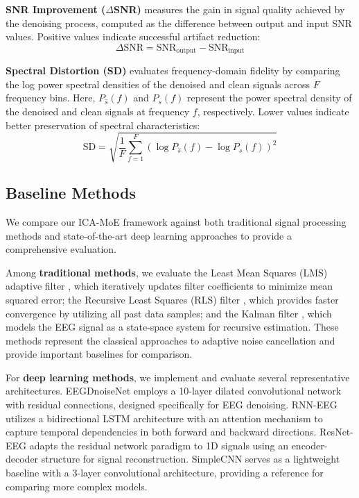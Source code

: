 \documentclass{article}
\begin{document}
\textbf{SNR Improvement ($\Delta$SNR)} measures the gain in signal quality achieved by the denoising process, computed as the difference between output and input SNR values. Positive values indicate successful artifact reduction:
\begin{equation}
\Delta\text{SNR} = \text{SNR}_{\text{output}} - \text{SNR}_{\text{input}}
\end{equation}

\textbf{Spectral Distortion (SD)} evaluates frequency-domain fidelity by comparing the log power spectral densities of the denoised and clean signals across $F$ frequency bins. Here, $P_{\hat{s}}(f)$ and $P_s(f)$ represent the power spectral density of the denoised and clean signals at frequency $f$, respectively. Lower values indicate better preservation of spectral characteristics:
\begin{equation}
\text{SD} = \sqrt{\frac{1}{F}\sum_{f=1}^{F}\left(\log P_{\hat{s}}(f) - \log P_s(f)\right)^2}
\end{equation}

\subsection{Baseline Methods}

We compare our ICA-MoE framework against both traditional signal processing methods and state-of-the-art deep learning approaches to provide a comprehensive evaluation.

Among \textbf{traditional methods}, we evaluate the Least Mean Squares (LMS) adaptive filter \cite{widrow1975adaptive}, which iteratively updates filter coefficients to minimize mean squared error; the Recursive Least Squares (RLS) filter \cite{haykin2014adaptive}, which provides faster convergence by utilizing all past data samples; and the Kalman filter \cite{morbidi2008application}, which models the EEG signal as a state-space system for recursive estimation. These methods represent the classical approaches to adaptive noise cancellation and provide important baselines for comparison.

For \textbf{deep learning methods}, we implement and evaluate several representative architectures. EEGDnoiseNet \cite{zhang2021eegdenoisenet} employs a 10-layer dilated convolutional network with residual connections, designed specifically for EEG denoising. RNN-EEG utilizes a bidirectional LSTM architecture with an attention mechanism to capture temporal dependencies in both forward and backward directions. ResNet-EEG adapts the residual network paradigm to 1D signals using an encoder-decoder structure for signal reconstruction. SimpleCNN serves as a lightweight baseline with a 3-layer convolutional architecture, providing a reference for comparing more complex models.
\end{document}
